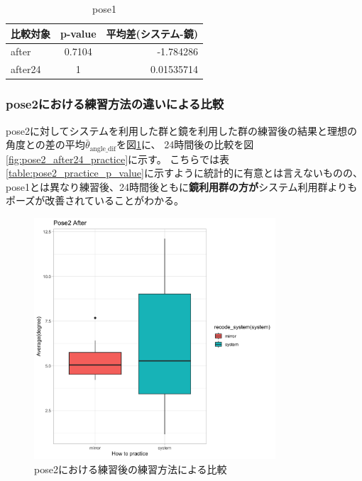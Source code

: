       \begin{table}[H]
        \centering
        \caption{pose1}
        \begin{tabular}{lcr}
        \hline
        \textbf{比較対象} & \textbf{p-value} & \textbf{平均差(システム-鏡)} \\ \hline
        after & 0.7104 & -1.784286\\ \hline
        after24 & 1 & 0.01535714\\ \hline
        \end{tabular}
        \label{table:pose1_practice_p_value}
        \end{table}
      
    \subsubsection{pose2における練習方法の違いによる比較}

      pose2に対してシステムを利用した群と鏡を利用した群の練習後の結果と理想の角度との差の平均\(\bar{\theta}_{\text{angle\_dif}}\)を図\ref{fig:pose2_after_practice}に、
      24時間後の比較を図\ref{fig:pose2_after24_practice}に示す。
      こちらでは表\ref{table:pose2_practice_p_value}に示すように統計的に有意とは言えないものの、pose1とは異なり練習後、24時間後ともに{\bf 鏡利用群の方が}システム利用群よりもポーズが改善されていることがわかる。
      \begin{figure}[H]
        \begin{center}
        \includegraphics[width=9cm]{figures/pose2_after_boxplot.png}
        \caption{pose2における練習後の練習方法による比較}
        \label{fig:pose2_after_practice}
        \end{center}
      \end{figure}

